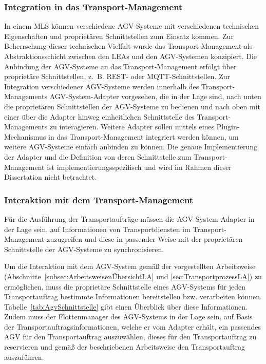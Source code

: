 \subsubsection{Integration in das Transport-Management}

In einem MLS können verschiedene AGV-Systeme mit verschiedenen technischen Eigenschaften und proprietären Schnittstellen zum Einsatz kommen. Zur Beherrschung dieser technischen Vielfalt wurde das Transport-Management als Abstraktionsschicht zwischen den LEAs und den AGV-Systemen konzipiert. Die Anbindung der AGV-Systeme an das Transport-Management erfolgt über proprietäre Schnittstellen, z.~B. REST- oder MQTT-Schnittstellen. Zur Integration verschiedener AGV-Systeme werden innerhalb des Transport-Managements AGV-System-Adapter vorgesehen, die in der Lage sind, nach unten die proprietären Schnittstellen der AGV-Systeme zu bedienen und nach oben mit einer über die Adapter hinweg einheitlichen Schnittstelle des Transport-Managements zu interagieren. Weitere Adapter sollen mittels eines Plugin-Mechanismus in das Transport-Management integriert werden können, um weitere AGV-Systeme einfach anbinden zu können. Die genaue Implementierung der Adapter und die Definition von deren Schnittstelle zum Transport-Management ist implementierungsspezifisch und wird im Rahmen dieser Dissertation nicht betrachtet.

\subsubsection{Interaktion mit dem Transport-Management}

Für die Ausführung der Transportaufträge müssen die AGV-System-Adapter in der Lage sein, auf Informationen von Transportdiensten im Transport-Management zuzugreifen und diese in passender Weise mit der proprietären Schnittstelle der AGV-Systeme zu synchronisieren. 

Um die Interaktion mit dem AGV-System gemäß der vorgestellten Arbeitsweise (Abschnitte~\ref{subsec:ArbeitsweisenÜbersichtLA} und \ref{sec:TransportprozessLA}) zu ermöglichen, muss die proprietäre Schnittstelle eines AGV-Systems für jeden Transportauftrag bestimmte Informationen bereitstellen bzw. verarbeiten können. Tabelle~\ref{tab:AgvSchnittstelle} gibt einen Überblick über diese Informationen. Zudem muss der Flottenmanager des AGV-Systems in der Lage sein, auf Basis der Transportauftragsinformationen, welche er vom Adapter erhält, ein passendes AGV für den Transportauftrag auszuwählen, dieses für den Transportauftrag zu reservieren und gemäß der beschriebenen Arbeitsweise den Transportauftrag auszuführen.

